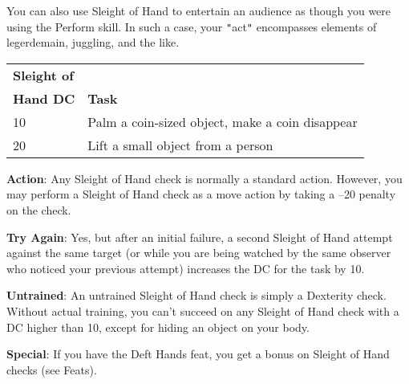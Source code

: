 You can also use Sleight of Hand to entertain an audience as though you were using the Perform skill. In such a case, your \texttt{{}"{}}act\texttt{{}"{}} encompasses elements of legerdemain, juggling, and the like.
\begin{table}
 \sffamily
 \begin{tabular}{ll}
\textbf{Sleight of} & \\
\textbf{Hand DC} & \textbf{Task}\\
10 & Palm a coin-sized object, make a coin disappear\\
20 & Lift a small object from a person\\  
 \end{tabular}

\end{table}
				
\textbf{Action}: Any Sleight of Hand check is normally a standard action. However, you may perform a Sleight of Hand check as a move action by taking a --20 penalty on the check.
				
\textbf{Try Again}: Yes, but after an initial failure, a second Sleight of Hand attempt against the same target (or while you are being watched by the same observer who noticed your previous attempt) increases the DC for the task by 10.
				
\textbf{Untrained}: An untrained Sleight of Hand check is simply a Dexterity check. Without actual training, you can't succeed on any Sleight of Hand check with a DC higher than 10, except for hiding an object on your body.
				
\textbf{Special}: If you have the Deft Hands feat, you get a bonus on Sleight of Hand checks (see Feats).
        	
